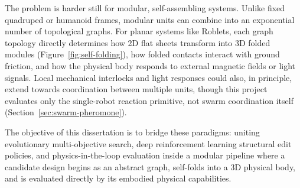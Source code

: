 \documentclass[12pt,a4paper]{report}
\begin{document}
The problem is harder still for modular, self-assembling systems. Unlike fixed quadruped or humanoid frames, modular units can combine into an exponential number of topological graphs. For planar systems like Roblets, each graph topology directly determines how 2D flat sheets transform into 3D folded modules (Figure~\ref{fig:self-folding}), how folded contacts interact with ground friction, and how the physical body responds to external magnetic fields or light signals. Local mechanical interlocks and light responses could also, in principle, extend towards coordination between multiple units, though this project evaluates only the single-robot reaction primitive, not swarm coordination itself (Section~\ref{sec:swarm-pheromone}).

The objective of this dissertation is to bridge these paradigms: uniting evolutionary multi-objective search, deep reinforcement learning structural edit policies, and physics-in-the-loop evaluation inside a modular pipeline where a candidate design begins as an abstract graph, self-folds into a 3D physical body, and is evaluated directly by its embodied physical capabilities.
\end{document}
